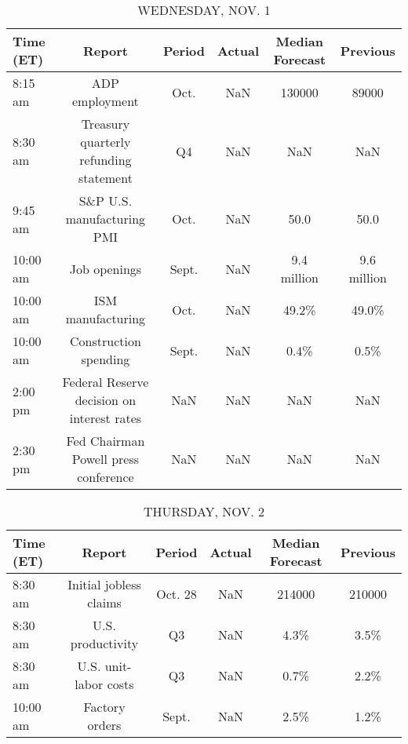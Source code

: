 \documentclass{article}%
\begin{document}
\begin{table}[htbp]%
\caption{WEDNESDAY, NOV. 1}%
\centering%
\begin{adjustbox}{width=1\textwidth}%
\begin{tabular}{lccccc}
\toprule
Time (ET) &                                     Report & Period & Actual & Median Forecast &    Previous \\
\midrule
  8:15 am &                             ADP employment &   Oct. &    NaN &          130000 &       89000 \\
  8:30 am &     Treasury quarterly refunding statement &     Q4 &    NaN &             NaN &         NaN \\
  9:45 am &                 S\&P U.S. manufacturing PMI &   Oct. &    NaN &            50.0 &        50.0 \\
 10:00 am &                               Job openings &  Sept. &    NaN &     9.4 million & 9.6 million \\
 10:00 am &                          ISM manufacturing &   Oct. &    NaN &           49.2\% &       49.0\% \\
 10:00 am &                      Construction spending &  Sept. &    NaN &            0.4\% &        0.5\% \\
  2:00 pm & Federal Reserve decision on interest rates &    NaN &    NaN &             NaN &         NaN \\
  2:30 pm &       Fed Chairman Powell press conference &    NaN &    NaN &             NaN &         NaN \\
\bottomrule
\end{tabular}
%
\end{adjustbox}%
\end{table}

%


\begin{table}[htbp]%
\caption{THURSDAY, NOV. 2}%
\centering%
\begin{adjustbox}{width=1\textwidth}%
\begin{tabular}{lccccc}
\toprule
Time (ET) &                 Report &  Period & Actual & Median Forecast & Previous \\
\midrule
  8:30 am & Initial jobless claims & Oct. 28 &    NaN &          214000 &   210000 \\
  8:30 am &      U.S. productivity &      Q3 &    NaN &            4.3\% &     3.5\% \\
  8:30 am &  U.S. unit-labor costs &      Q3 &    NaN &            0.7\% &     2.2\% \\
 10:00 am &         Factory orders &   Sept. &    NaN &            2.5\% &     1.2\% \\
\bottomrule
\end{tabular}
%
\end{adjustbox}%
\end{table}
\end{document}
